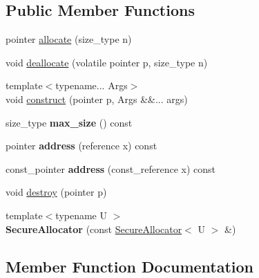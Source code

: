\subsection*{Public Member Functions}
\begin{DoxyCompactItemize}
\item 
pointer \hyperlink{classJson_1_1SecureAllocator_a9b7d7180b360ebd673bdcfab25c1d5a4}{allocate} (size\+\_\+type n)
\item 
void \hyperlink{classJson_1_1SecureAllocator_a93c86d9e9031b81a046b3db8897811f2}{deallocate} (volatile pointer p, size\+\_\+type n)
\item 
{\footnotesize template$<$typename... Args$>$ }\\void \hyperlink{classJson_1_1SecureAllocator_acd466192ba41ea5468bd2f45ae9de9fb}{construct} (pointer p, Args \&\&... args)
\item 
size\+\_\+type {\bfseries max\+\_\+size} () const\hypertarget{classJson_1_1SecureAllocator_a1ca352414d0ce358c0dca70fb26c674c}{}\label{classJson_1_1SecureAllocator_a1ca352414d0ce358c0dca70fb26c674c}

\item 
pointer {\bfseries address} (reference x) const\hypertarget{classJson_1_1SecureAllocator_a2f26b3dbf3cfffcc376844fb19733422}{}\label{classJson_1_1SecureAllocator_a2f26b3dbf3cfffcc376844fb19733422}

\item 
const\+\_\+pointer {\bfseries address} (const\+\_\+reference x) const\hypertarget{classJson_1_1SecureAllocator_a228944048dd7266f219b52fd1958b4d5}{}\label{classJson_1_1SecureAllocator_a228944048dd7266f219b52fd1958b4d5}

\item 
void \hyperlink{classJson_1_1SecureAllocator_a7316f4efeb3b992c69c94e345ac9f5cd}{destroy} (pointer p)
\item 
{\footnotesize template$<$typename U $>$ }\\{\bfseries Secure\+Allocator} (const \hyperlink{classJson_1_1SecureAllocator}{Secure\+Allocator}$<$ U $>$ \&)\hypertarget{classJson_1_1SecureAllocator_afefbe83997eb1da2089229771957e6bd}{}\label{classJson_1_1SecureAllocator_afefbe83997eb1da2089229771957e6bd}

\end{DoxyCompactItemize}


\subsection{Member Function Documentation}
